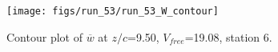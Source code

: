 \begin{figure}[H]
\centering
\texttt{[image: figs/run\_53/run\_53\_W\_contour]}
\caption{Contour plot of $\overline{w}$ at $z/c$=9.50, $V_{free}$=19.08, station 6.}
\label{fig:run_53_W_contour}
\end{figure}


